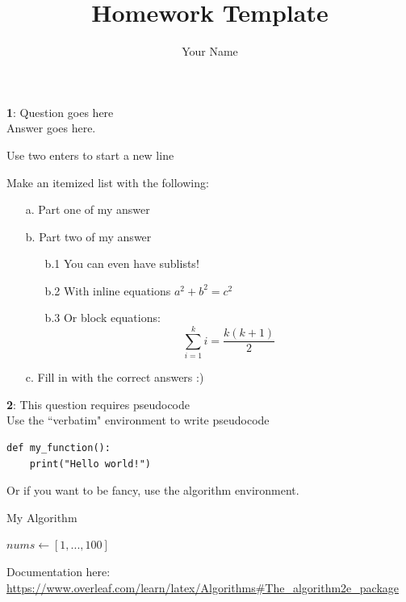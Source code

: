 \documentclass{article}
\title{Homework Template}
\author{Your Name}
\date{}
\newcommand{\question}[2]{\noindent\textbf{#1}: #2\\}
\begin{document}
\maketitle
\vspace{-5em}

\question{1}{Question goes here}
Answer goes here.

Use two enters to start a new line

Make an itemized list with the following:
\begin{itemize}
    \item [a.] Part one of my answer
    \item [b.] Part two of my answer
    \begin{itemize}
        \item [b.1] You can even have sublists!
        \item [b.2] With inline equations $a^2+b^2=c^2$
        \item [b.3] Or block equations:
        $$
        \sum_{i=1}^k i = \frac{k(k+1)}{2}
        $$
    \end{itemize}
    \item [c.] Fill in with the correct answers :)
\end{itemize}

\question{2}{This question requires pseudocode}
Use the ``verbatim" environment to write pseudocode
\begin{verbatim}
def my_function():
    print("Hello world!")
\end{verbatim}

Or if you want to be fancy, use the algorithm environment.
\begin{algorithm}
    \caption{My Algorithm}
    $nums \gets [1,...,100]$\;
\end{algorithm}

Documentation here:
\url{https://www.overleaf.com/learn/latex/Algorithms#The_algorithm2e_package}
\end{document}
